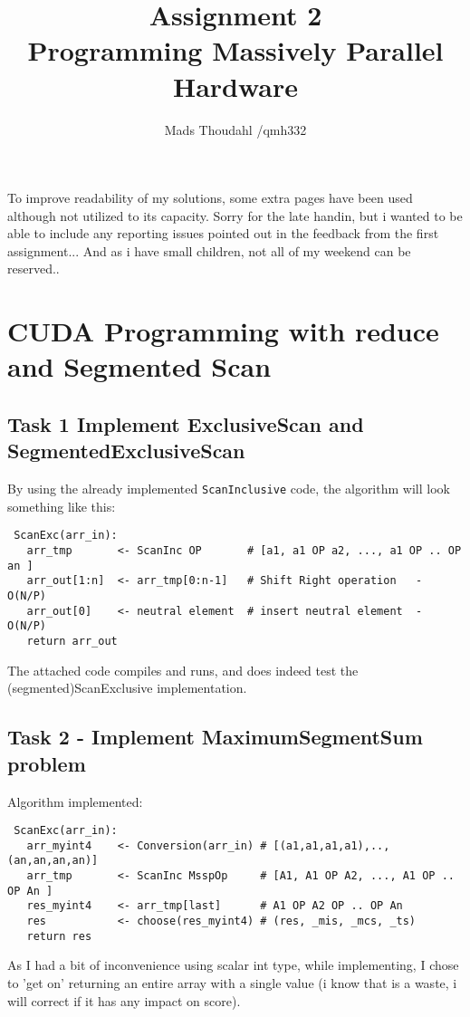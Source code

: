 \documentclass[a4paper,10pt]{article}
\title{Assignment 2  \\Programming Massively Parallel Hardware }
\author{Mads Thoudahl /qmh332}
\begin{document}
\maketitle

To improve readability of my solutions, some extra pages have been used although not utilized to its capacity.
Sorry for the late handin, but i wanted to be able to include any reporting issues pointed out in the feedback from the first assignment... And as i have small children, not all of my weekend can be reserved..



\vfill
\section{CUDA Programming with reduce and Segmented Scan}


\vfill
\subsection{Task 1 Implement ExclusiveScan and SegmentedExclusiveScan}
By using the already implemented \texttt{ScanInclusive} code, the algorithm will look something like this:

\begin{verbatim}
 ScanExc(arr_in):
   arr_tmp       <- ScanInc OP       # [a1, a1 OP a2, ..., a1 OP .. OP an ]
   arr_out[1:n]  <- arr_tmp[0:n-1]   # Shift Right operation   - O(N/P)
   arr_out[0]    <- neutral element  # insert neutral element  - O(N/P)
   return arr_out
\end{verbatim}

The attached code compiles and runs, and does indeed test the (segmented)ScanExclusive implementation.
\vfill

\newpage

\subsection{Task 2 - Implement MaximumSegmentSum problem}
Algorithm implemented:
\begin{verbatim}
 ScanExc(arr_in):
   arr_myint4    <- Conversion(arr_in) # [(a1,a1,a1,a1),..,(an,an,an,an)]
   arr_tmp       <- ScanInc MsspOp     # [A1, A1 OP A2, ..., A1 OP .. OP An ]
   res_myint4    <- arr_tmp[last]      # A1 OP A2 OP .. OP An
   res           <- choose(res_myint4) # (res, _mis, _mcs, _ts)
   return res
\end{verbatim}
As I had a bit of inconvenience using scalar int type, while implementing, I chose to 'get on' returning an entire array with a single value (i know that is a waste, i will correct if it has any impact on score).
\end{document}
